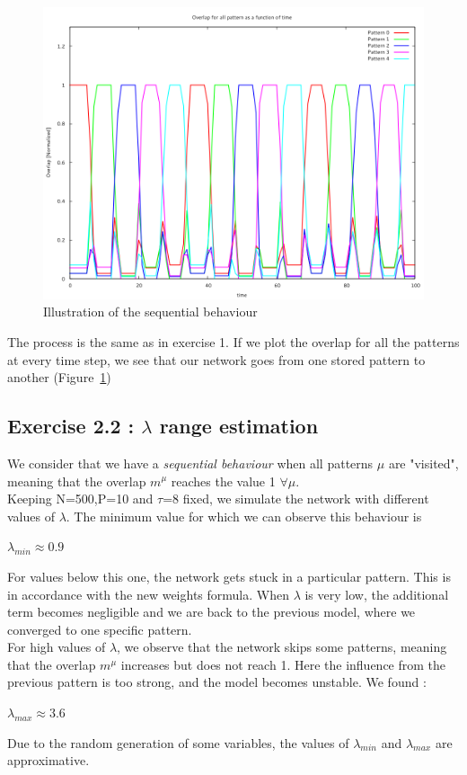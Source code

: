\begin{figure}\label{seq}
    \begin{center}
    \caption{Illustration of the sequential behaviour}
    \includegraphics[scale=0.3]{img/ex21.png}
    \end{center}
\end{figure}
The process is the same as in exercise 1. If we plot the overlap for all the patterns at every
time step, we see that our network goes from one stored pattern to another (Figure~\ref{seq})


\subsection{Exercise 2.2 : $\lambda$ range estimation}
We consider that we have a {\it sequential behaviour} when all patterns $\mu$ are "visited", meaning that the overlap $m^{\mu}$ reaches the value 1 $\forall \mu$.\\ 
Keeping N=500,P=10 and $\tau$=8 fixed, we simulate the network with different values of $\lambda$. The minimum value for which we can observe this behaviour is 
\begin{center}
$\lambda_{min} \approx 0.9$
\end{center}
For values below this one, the network gets stuck in a particular pattern. This is in accordance with the new weights formula. When $\lambda$ is very low, the additional term becomes negligible and we are back to the previous model, where we converged to one specific pattern. \\ 
For high values of $\lambda$, we observe that the network skips some patterns, meaning that the overlap $m^{\mu}$ increases but does not reach 1. Here the influence from the previous pattern is too strong, and the model becomes unstable. We found :
\begin{center}
$\lambda_{max} \approx 3.6$
\end{center}
Due to the random generation of some variables, the values of $\lambda_{min}$ and $\lambda_{max}$ are approximative.
